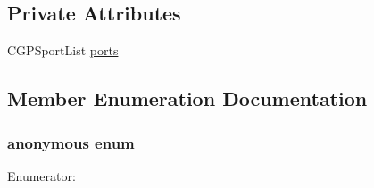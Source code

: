 \subsection*{Private Attributes}
\begin{DoxyCompactItemize}
\item 
CGPSportList \hyperlink{classCSetupDialog_ac05f58b8de217ce33a9f52b7f41a497a}{ports}
\end{DoxyCompactItemize}


\subsection{Member Enumeration Documentation}
\hypertarget{classCSetupDialog_ace495d39f6e137af9aa38d8280538bc8}{
\subsubsection[{"@9}]{\setlength{\rightskip}{0pt plus 5cm}anonymous enum}}
\label{classCSetupDialog_ace495d39f6e137af9aa38d8280538bc8}
\begin{Desc}
\item[Enumerator: ]\par
\begin{description}
\item[{\em 
\hypertarget{classCSetupDialog_ace495d39f6e137af9aa38d8280538bc8a3b834c0eeebd3d78c306c35b991bcf2d}{
IDD}
\label{classCSetupDialog_ace495d39f6e137af9aa38d8280538bc8a3b834c0eeebd3d78c306c35b991bcf2d}
}]\end{description}
\end{Desc}



